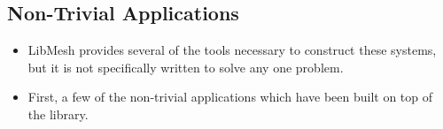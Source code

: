 \subsection*{Non-Trivial Applications}
\begin{frame}%
  \begin{itemize}%
  \item{LibMesh provides several of the tools necessary to construct
    these systems, but it is not specifically written to solve any one
    problem.}

  \item{First, a few of the non-trivial applications which have been built on
    top of the library.}
    

  \end{itemize}
\end{frame}	  
